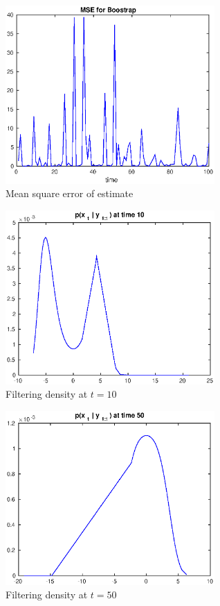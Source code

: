 \documentclass[11pt, english]{article}
\begin{document}
\begin{figure}[h]
  
  \centering
    \includegraphics[width=80mm]{./figs/014_15_mseN1000.eps}
    \caption{Mean square error of estimate}
    \label{n10001}
\end{figure}

\begin{figure}[h]
  
  \centering
    \includegraphics[width=80mm]{./figs/015_15_t10N1000.eps}
    \caption{Filtering density at $t=10$}
    \label{n10002}
\end{figure}

\begin{figure}[h]
  
  \centering
    \includegraphics[width=80mm]{./figs/016_15_t50N1000.eps}
    \caption{Filtering density at $t=50$}
    \label{n10003}
\end{figure}
\end{document}
